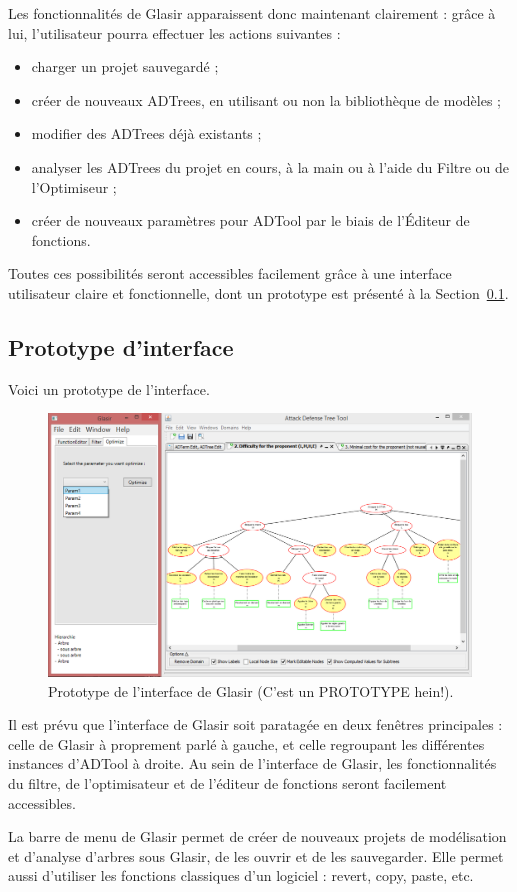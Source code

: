     Les fonctionnalités de Glasir apparaissent donc maintenant clairement : grâce à lui, l'utilisateur pourra effectuer les actions suivantes : 

    \begin{itemize}
    \item charger un projet sauvegardé ;
    \item créer de nouveaux ADTrees, en utilisant ou non la bibliothèque de modèles ;
    \item modifier des ADTrees déjà existants ;
    \item analyser les ADTrees du projet en cours, à la main ou à l'aide du Filtre ou de l'Optimiseur ;
    \item créer de nouveaux paramètres pour ADTool par le biais de l'Éditeur de fonctions.
    \end{itemize}  

    Toutes ces possibilités seront accessibles facilement grâce à une interface utilisateur claire et fonctionnelle, dont un prototype est présenté à la {\sc Section}~\ref{sec:interface}.      
    
    \subsection{Prototype d'interface}
    \label{sec:interface}
    
    Voici un prototype de l'interface.
    \begin{figure}[h!]
        \centering
        \includegraphics[height=0.4\textwidth]{figure/interface.png}
        \caption{Prototype de l'interface de Glasir (C'est un PROTOTYPE hein!).}
        \label{fig:interface}
    \end{figure}
    
Il est prévu que l'interface de Glasir soit paratagée en deux fenêtres principales : celle de Glasir à proprement parlé à gauche, et celle regroupant les différentes instances d'ADTool à droite. Au sein de l'interface de Glasir, les fonctionnalités du filtre, de l'optimisateur et de l'éditeur de fonctions seront facilement accessibles.

La barre de menu de Glasir permet de créer de nouveaux projets de modélisation et d'analyse d'arbres sous Glasir, de les ouvrir et de les sauvegarder. Elle permet aussi d'utiliser les fonctions classiques d'un logiciel : revert, copy, paste, etc.